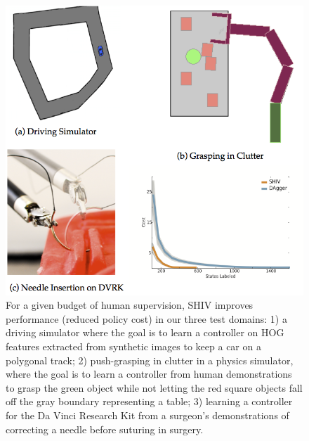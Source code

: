 \documentclass[10pt, conference]{ieeeconf}      %
\begin{document}
\begin{figure}[t!]
\centering
\includegraphics[width=\columnwidth]{figures/teaser.pdf}
\caption{ 
For a given budget of human supervision, SHIV improves performance (reduced policy cost) in our three test domains: 1) a driving simulator where the goal is to learn a controller on HOG features extracted from synthetic images to keep a car on a polygonal track; 2) push-grasping in clutter in a physics simulator, where the goal is to learn a controller from human demonstrations to grasp the green object while not letting the red square objects fall off the gray boundary representing a table; 3) learning a controller for the Da Vinci Research Kit from a surgeon's demonstrations of correcting a needle before suturing in surgery. 
}
\vspace*{-10pt}
\label{fig:teaser}
\end{figure}
\end{document}
